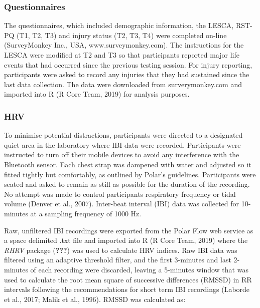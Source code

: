 \documentclass[utf8]{frontiersHLTH}
\begin{document}
\hypertarget{questionnaires}{%
\subsubsection*{Questionnaires}\label{questionnaires}}

The questionnaires, which included demographic information, the LESCA,
RST-PQ (T1, T2, T3) and injury status (T2, T3, T4) were completed
on-line (SurveyMonkey Inc., USA, www.surveymonkey.com). The instructions
for the LESCA were modified at T2 and T3 so that participants reported
major life events that had occurred since the previous testing session.
For injury reporting, participants were asked to record any injuries
that they had sustained since the last data collection. The data were
downloaded from surverymonkey.com and imported into R (R Core Team,
2019) for analysis purposes.

\hypertarget{hrv}{%
\subsubsection*{HRV}\label{hrv}}

To minimise potential distractions, participants were directed to a
designated quiet area in the laboratory where IBI data were recorded.
Participants were instructed to turn off their mobile devices to avoid
any interference with the Bluetooth sensor. Each chest strap was
dampened with water and adjusted so it fitted tightly but comfortably,
as outlined by Polar's guidelines. Participants were seated and asked to
remain as still as possible for the duration of the recording. No
attempt was made to control participants respiratory frequency or tidal
volume (Denver et al., 2007). Inter-beat interval (IBI) data was
collected for 10-minutes at a sampling frequency of 1000 Hz.

Raw, unfiltered IBI recordings were exported from the Polar Flow web
service as a space delimited .txt file and imported into R (R Core Team,
2019) where the \emph{RHRV} package ({\textbf{???}}) was used to
calculate HRV indices. Raw IBI data was filtered using an adaptive
threshold filter, and the first 3-minutes and last 2-minutes of each
recording were discarded, leaving a 5-minutes window that was used to
calculate the root mean square of successive differences (RMSSD) in RR
intervals following the recommendations for short term IBI recordings
(Laborde et al., 2017; Malik et al., 1996). RMSSD was calculated as:
\end{document}

